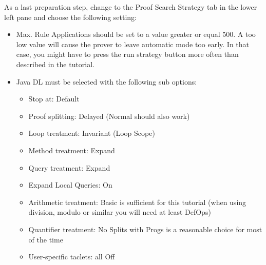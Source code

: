 As a last preparation step, change to the \textsf{Proof Search
  Strategy} tab in the lower left pane and choose the following setting:
\begin{itemize}

\item \textsf{Max. Rule Applications} should be set to a value greater
  or equal 500. A too low value will cause the prover to leave
  automatic mode too early. In that case, you might have to press the
  run strategy button more often than described in the tutorial.
\item \textsf{Java DL} must be selected with the following sub
  options:
  \begin{itemize}

    \item Stop at: \textsf{Default}
   \item Proof splitting: \textsf{Delayed} (\textsf{Normal} should
      also work)
    \item Loop treatment: \textsf{Invariant (Loop Scope)} 
    \item Method treatment: \textsf{Expand}
    \item Query treatment: \textsf{Expand}
    \item Expand Local Queries: \textsf{On}
    \item Arithmetic treatment: \textsf{Basic} is sufficient for this
      tutorial (when using division, modulo or similar you will need
      at least \textsf{DefOps})
    \item Quantifier treatment: \textsf{No Splits with Progs} is a
      reasonable choice for most of the time
    \item User-specific taclets: all \textsf{Off}
  \end{itemize}
\end{itemize}
 


